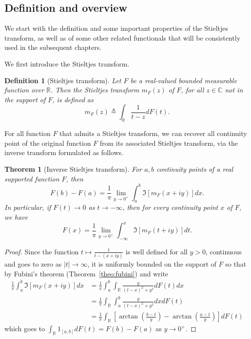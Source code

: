 \documentclass[MAL,biber]{nowfnt} %
\newtheorem{Theorem}{Theorem}
\newtheorem{Definition}{Definition}
\newcommand{\RR}{{\mathbb{R}}}
\newcommand{\CC}{{\mathbb{C}}}
\begin{document}
\subsection{Definition and overview}

We start with the definition and some important properties of the Stieltjes transform, as well as of some other related functionals that will be consistently used in the subsequent chapters.

We first introduce the Stieltjes transform.
\begin{Definition}[Stieltjes transform]\label{def:ST}
Let $F$ be a real-valued bounded measurable function over $\RR$. Then the Stieltjes transform $m_F(z)$ of $F$, for all $z\in\CC$ not in the support of $F$, is defined as
\begin{equation}
	m_F(z) \triangleq \int_\RR \frac1{t - z} dF(t).
\end{equation}
\end{Definition}

For all function $F$ that admits a Stieltjes transform, we can recover all continuity point of the original function $F$ from its associated Stieltjes transform, via the inverse transform formulated as follows.

\begin{Theorem}[Inverse Stieltjes transform]\label{theo:inverse-ST}
For $a,b$ continuity points of a real supported function $F$, then
\[
	F(b) - F(a) = \frac1{\pi} \lim_{y \to 0^+} \int_a^b \Im \left[ m_F(x+iy) \right] dx.
\]
In particular, if $F(t) \to 0 $ as $t \to -\infty$, then for every continuity point $x$ of $F$, we have
\[
	F(x) = \frac1{\pi} \lim_{y \to 0^+} \int_{-\infty}^x \Im \left[ m_F(t+iy) \right] dt.
\]
\end{Theorem}
\begin{proof}
Since the function $t \mapsto \frac1{t - (x+iy)}$ is well defined for all $y >0$, continuous and goes to zero as $|t| \to \infty$, it is uniformly bounded on the support of $F$ so that by Fubini's theorem (Theorem~\ref{theo:fubini}) and write
\begin{align*}
	\frac1{\pi} \int_a^b \Im \left[ m_F(x+iy) \right] dx &= \frac1{\pi} \int_a^b \int_\RR \frac{y}{(t-x)^2 + y^2} d F(t) dx \\
	&= \frac1{\pi} \int_\RR \int_a^b \frac{y}{(t-x)^2 + y^2} dx dF(t) \\
	&= \frac1{\pi} \int_\RR \left[ \arctan \left( \frac{b-t}y \right) - \arctan \left( \frac{a-t}y \right) \right] dF(t)
\end{align*}
which goes to $\int_\RR 1_{[a,b]} dF(t) = F(b) - F(a)$ as $y \to 0^+$.
\end{proof}
\end{document}
